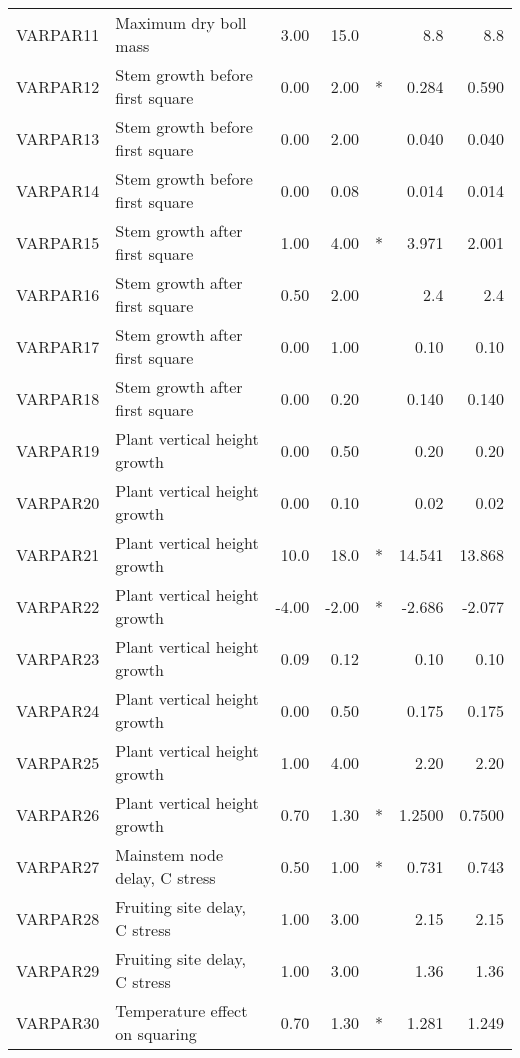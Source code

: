 \begin{longtable}{llrrcrr}
    VARPAR11 & Maximum dry boll mass            & 3.00   & 15.0   &     & 8.8     & 8.8     \\
    VARPAR12 & Stem growth before first square  & 0.00   & 2.00   & *   & 0.284   & 0.590   \\
    VARPAR13 & Stem growth before first square  & 0.00   & 2.00   &     & 0.040   & 0.040   \\
    VARPAR14 & Stem growth before first square  & 0.00   & 0.08   &     & 0.014   & 0.014   \\
    VARPAR15 & Stem growth after first square   & 1.00   & 4.00   & *   & 3.971   & 2.001   \\
    VARPAR16 & Stem growth after first square   & 0.50   & 2.00   &     & 2.4     & 2.4     \\
    VARPAR17 & Stem growth after first square   & 0.00   & 1.00   &     & 0.10    & 0.10    \\
    VARPAR18 & Stem growth after first square   & 0.00   & 0.20   &     & 0.140   & 0.140   \\
    VARPAR19 & Plant vertical height growth     & 0.00   & 0.50   &     & 0.20    & 0.20    \\
    VARPAR20 & Plant vertical height growth     & 0.00   & 0.10   &     & 0.02    & 0.02    \\
    VARPAR21 & Plant vertical height growth     & 10.0   & 18.0   & *   & 14.541  & 13.868  \\
    VARPAR22 & Plant vertical height growth     & -4.00  & -2.00  & *   & -2.686  & -2.077  \\
    VARPAR23 & Plant vertical height growth     & 0.09   & 0.12   &     & 0.10    & 0.10    \\
    VARPAR24 & Plant vertical height growth     & 0.00   & 0.50   &     & 0.175   & 0.175   \\
    VARPAR25 & Plant vertical height growth     & 1.00   & 4.00   &     & 2.20    & 2.20    \\
    VARPAR26 & Plant vertical height growth     & 0.70   & 1.30   & *   & 1.2500  & 0.7500  \\
    VARPAR27 & Mainstem node delay, C stress    & 0.50   & 1.00   & *   & 0.731   & 0.743   \\
    VARPAR28 & Fruiting site delay, C stress    & 1.00   & 3.00   &     & 2.15    & 2.15    \\
    VARPAR29 & Fruiting site delay, C stress    & 1.00   & 3.00   &     & 1.36    & 1.36    \\
    VARPAR30 & Temperature effect on squaring   & 0.70   & 1.30   & *   & 1.281   & 1.249   \\

\end{longtable}
